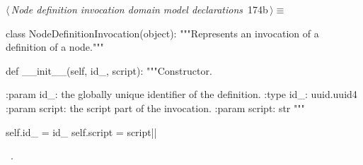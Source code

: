 \documentclass[%
    a4paper,    %
    justified,  %
    nobib,      %
    openany     %
]{tufte-book}
\begin{document}
\begin{flushleft} \small
\begin{minipage}{\linewidth}\label{scrap200}\raggedright\small
{} $\langle\,${\itshape Node definition invocation domain model declarations}\nobreak\ {\footnotesize {174b}}$\,\rangle\equiv$
\vspace{-1ex}
\begin{pythoncode}
class NodeDefinitionInvocation(object):
    """Represents an invocation of a definition of a node."""

    def __init__(self, id_, script):
        """Constructor.

        :param id_: the globally unique identifier of the definition.
        :type  id_: uuid.uuid4
        :param script: the script part of the invocation.
        :param script: str
        """

        self.id_ = id_
        self.script = script|\NWsep|
\end{pythoncode}
\vspace{1.5ex}
\footnotesize
\begin{list}{}{\setlength{\itemsep}{-\parsep}\setlength{\itemindent}{-\leftmargin}}
\item \NWtxtMacroRefIn\ .

\item{}
\end{list}
\end{minipage}\vspace{4ex}
\end{flushleft}
\end{document}
